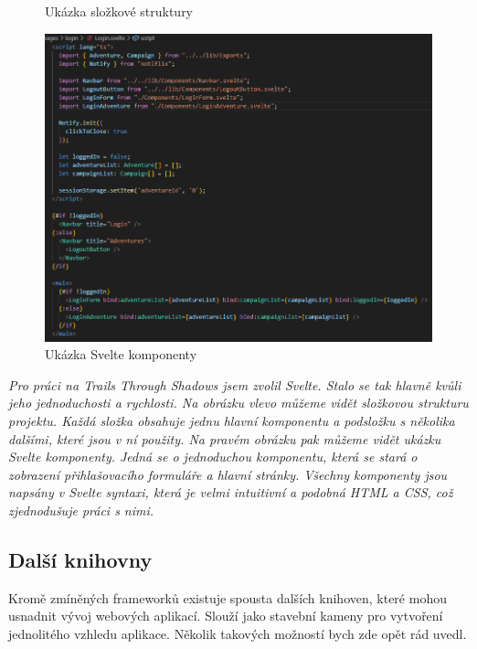 \begin{figure}[H]
\begin{minipage}{0.25\textwidth}
    \caption{Ukázka složkové struktury}
    \label{fig:example7}
  \end{minipage}
    \begin{minipage}{0.75\textwidth}
    \centering
    \includegraphics[width=\textwidth]{resources/figures/example8.png}
    \caption{Ukázka Svelte komponenty}
    \label{fig:frameworks}
  \end{minipage}
\end{figure}

\textit{Pro práci na Trails Through Shadows jsem zvolil Svelte. Stalo se tak hlavně kvůli jeho jednoduchosti a rychlosti. Na obrázku vlevo můžeme vidět složkovou strukturu projektu. Každá složka obsahuje jednu hlavní komponentu a podsložku s několika dalšími, které jsou v ní použity. Na pravém obrázku pak můžeme vidět ukázku Svelte komponenty. Jedná se o jednoduchou komponentu, která se stará o zobrazení přihlašovacího formuláře a hlavní stránky. Všechny komponenty jsou napsány v Svelte syntaxi, která je velmi intuitivní a podobná HTML a CSS, což zjednodušuje práci s nimi.}

\subsection{Další knihovny}
\label{sec:other-libraries}

Kromě zmíněných frameworků existuje spousta dalších knihoven, které mohou usnadnit vývoj webových aplikací. Slouží jako stavební kameny pro vytvoření jednolitého vzhledu aplikace. Několik takových možností bych zde opět rád uvedl.

